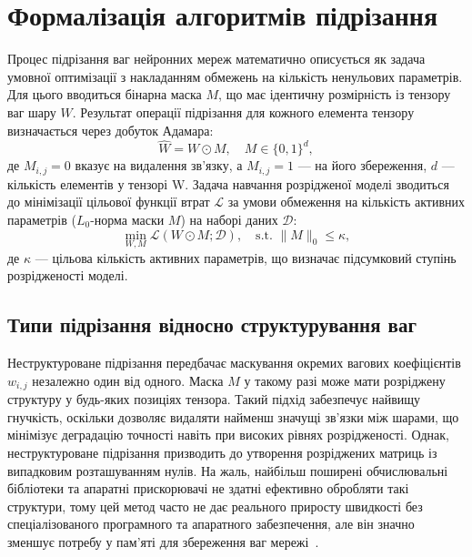 \documentclass{pma-mthesis}
\begin{document}

\section{Формалізація алгоритмів підрізання}

Процес підрізання ваг нейронних мереж математично описується як задача умовної оптимізації з накладанням обмежень на кількість ненульових параметрів. Для цього вводиться бінарна маска $M$, що має ідентичну розмірність із тензору ваг шару $W$. Результат операції підрізання для кожного елемента тензору визначається через добуток Адамара:
\begin{equation}
    \hat{W} = W \odot M, \quad M \in \{0, 1\}^{d},
\end{equation}
де $M_{i,j} = 0$ вказує на видалення зв'язку, а $M_{i,j} = 1$ --- на його збереження, $d$ --- кількість елементів у тензорі W. Задача навчання розрідженої моделі зводиться до мінімізації цільової функції втрат $\mathcal{L}$ за умови обмеження на кількість активних параметрів ($L_0$-норма маски $M$) на наборі даних $\mathcal{D}$:
\begin{equation}
    \min_{W, M} \mathcal{L}(W \odot M; \mathcal{D}), \quad \text{s.t. } \|M\|_0 \leq \kappa,
\end{equation}
де $\kappa$ --- цільова кількість активних параметрів, що визначає підсумковий ступінь розрідженості моделі. 

\subsection{Типи підрізання відносно структурування ваг}

Неструктуроване підрізання передбачає маскування окремих вагових коефіцієнтів $w_{i,j}$ незалежно один від одного. Маска $M$ у такому разі може мати розріджену структуру у будь-яких позиціях тензора. Такий підхід забезпечує найвищу гнучкість, оскільки дозволяє видаляти найменш значущі зв'язки між шарами, що мінімізує деградацію точності навіть при високих рівнях розрідженості. Однак, неструктуроване підрізання призводить до утворення розріджених матриць із випадковим розташуванням нулів. На жаль, найбільш поширені обчислювальні бібліотеки та апаратні прискорювачі не здатні ефективно обробляти такі структури, тому цей метод часто не дає реального приросту швидкості без спеціалізованого програмного та апаратного забезпечення, але він значно зменшує потребу у пам'яті для збереження ваг мережі~\cite{Han2016DeepCompression}.
\end{document}
